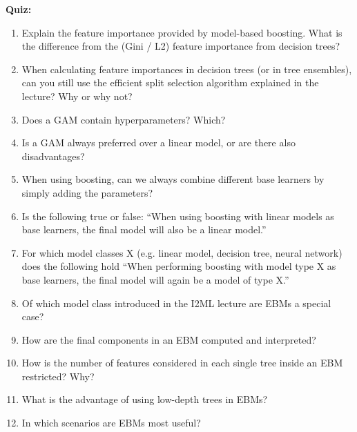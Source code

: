 \textbf{Quiz:}

\begin{enumerate}
    \item Explain the feature importance provided by model-based boosting. What is the difference from the (Gini / L2) feature importance from decision trees?
    
    \item When calculating feature importances in decision trees (or in tree ensembles), can you still use the efficient split selection algorithm explained in the lecture? Why or why not?
    
    \item Does a GAM contain hyperparameters? Which?

    \item Is a GAM always preferred over a linear model, or are there also disadvantages?

    \item When using boosting, can we always combine different base learners by simply adding the parameters?

    \item Is the following true or false: ``When using boosting with linear models as base learners, the final model will also be a linear model.''


    \item For which model classes X (e.g. linear model, decision tree, neural network) does the following hold ``When performing boosting with model type X as base learners, the final model will again be a model of type X.''
    
    \item Of which model class introduced in the I2ML lecture are EBMs a special case?
    
    \item How are the final components in an EBM computed and interpreted?

    \item How is the number of features considered in each single tree inside an EBM restricted? Why?

    \item What is the advantage of using low-depth trees in EBMs?

    \item In which scenarios are EBMs most useful?

    
\end{enumerate}


